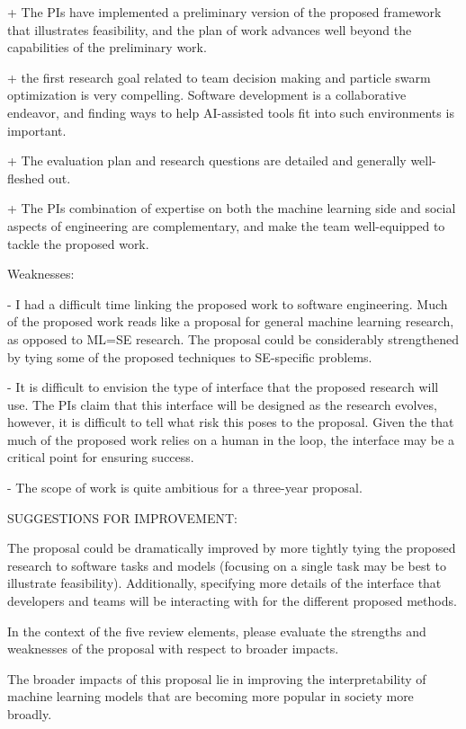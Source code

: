 + The PIs have implemented a preliminary version of the proposed framework that illustrates feasibility, and the plan of work advances well beyond the capabilities of the preliminary work.

+ the first research goal related to team decision making and particle swarm optimization is very compelling. Software development is a collaborative endeavor, and finding ways to help AI-assisted tools fit into such environments is important.

+ The evaluation plan and research questions are detailed and generally well-fleshed out.

+ The PIs combination of expertise on both the machine learning side and social aspects of engineering are complementary, and make the team well-equipped to tackle the proposed work.

Weaknesses:

- I had a difficult time linking the proposed work to software engineering. Much of the proposed work reads like a proposal for general machine learning research, as opposed to ML=SE research. The proposal could be considerably strengthened by tying some of the proposed techniques to SE-specific problems.

- It is difficult to envision the type of interface that the proposed research will use. The PIs claim that this interface will be designed as the research evolves, however, it is difficult to tell what risk this poses to the proposal. Given the that much of the proposed work relies on a human in the loop, the interface may be a critical point for ensuring success.

- The scope of work is quite ambitious for a three-year proposal.

SUGGESTIONS FOR IMPROVEMENT:

The proposal could be dramatically improved by more tightly tying the proposed research to software tasks and models (focusing on a single task may be best to illustrate feasibility). Additionally, specifying more details of the interface that developers and teams will be interacting with for the different proposed methods.


In the context of the five review elements, please
evaluate the strengths and weaknesses of the proposal with respect to broader impacts.

The broader impacts of this proposal lie in improving the interpretability of machine learning models that are becoming more popular in society more broadly.

